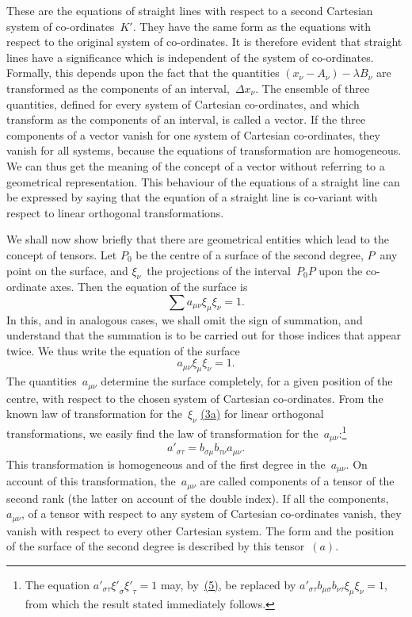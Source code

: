 \documentclass[12pt]{book}[2005/09/16]
\newcommand{\Change}[2]{#2}
\newcommand{\PageSep}[1]{\ignorespaces}
\newcommand{\Eqref}[1]{\hyperref[eqn:#1]{#1}}
\begin{document}
These are the equations of straight lines with respect
to a second Cartesian system of co-ordinates~$K'$. They
have the same form as the equations with respect to the
original system of co-ordinates. It is therefore evident
that straight lines have a significance which is independent
of the system of co-ordinates. Formally, this depends
upon the fact that the quantities $(x_{\nu} - A_{\nu}) - \lambda B_{\nu}$ are
transformed as the components of an interval,~$\Delta x_{\nu}$. The
ensemble of three quantities, defined for every system of
Cartesian co-ordinates, and which transform as the components
of an interval, is called a vector. If the three
components of a vector vanish for one system of Cartesian
co-ordinates, they vanish for all systems, because the equations
of transformation are homogeneous. We can thus
get the meaning of the concept of a vector without referring
to a geometrical representation. This behaviour of the
equations of a straight line can be expressed by saying
that the equation of a straight line is co-variant with respect
%
to linear orthogonal transformations.

We shall now show briefly that there are geometrical
%
entities which lead to the concept of tensors. Let $P_{0}$ be
the centre of a surface of the second degree, $P$~any point
on the surface, and $\xi_{\nu}$~the projections of the interval~$P_{0}P$
upon the co-ordinate axes. Then the equation of the
surface is
\[
\sum a_{\mu\nu} \xi_{\mu} \xi_{\nu} = 1.
\]
\PageSep{13}
In this, and in analogous cases, we shall omit the sign of
summation, and understand that the summation is to be
carried out for those indices that appear twice. We thus
write the equation of the surface
\[
a_{\mu\nu} \xi_{\mu} \xi_{\nu} = 1.
\]
The quantities~$a_{\mu\nu}$ determine the surface completely, for
a given position of the centre, with respect to the chosen
system of Cartesian co-ordinates. From the known law
of transformation for the~$\xi_{\nu}$ \Eqref{(3a)} for linear orthogonal
transformations, we easily find the law of transformation
for the~$a_{\mu\nu}$:\footnote
  {The equation ${a'}_{\sigma\tau} {\xi'}_{\sigma} {\xi'}_{\tau} = 1$ may, by~\Eqref{(5)}, be replaced by
  ${a'}_{\sigma\tau} b_{\mu\sigma} b_{\nu\tau} \xi_{\Change{\sigma}{\mu}} \xi_{\Change{\tau}{\nu}} = 1$,
  from which the result stated immediately follows.}
\[
{a'}_{\sigma\tau} = b_{\sigma\mu} b_{\tau\nu} a_{\mu\nu}.
\]
This transformation is homogeneous and of the first degree
in the~$a_{\mu\nu}$. On account of this transformation, the~$a_{\mu\nu}$
are called components of a tensor of the second rank (the
latter on account of the double index). If all the components,~$a_{\mu\nu}$,
of a tensor with respect to any system of
Cartesian co-ordinates vanish, they vanish with respect to
every other Cartesian system. The form and the position
of the surface of the second degree is described by this
tensor~$(a)$.
\end{document}
